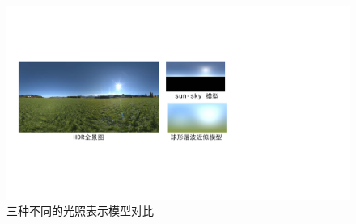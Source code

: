 \begin{figure}[!htbp]
    \centering
    \includegraphics[width=1.0\textwidth]{Img/lighting-representation.pdf}

    \caption[光照表示模型的示例]
    {三种不同的光照表示模型对比}
    
    \label{fig:lighting-representation}
\end{figure}